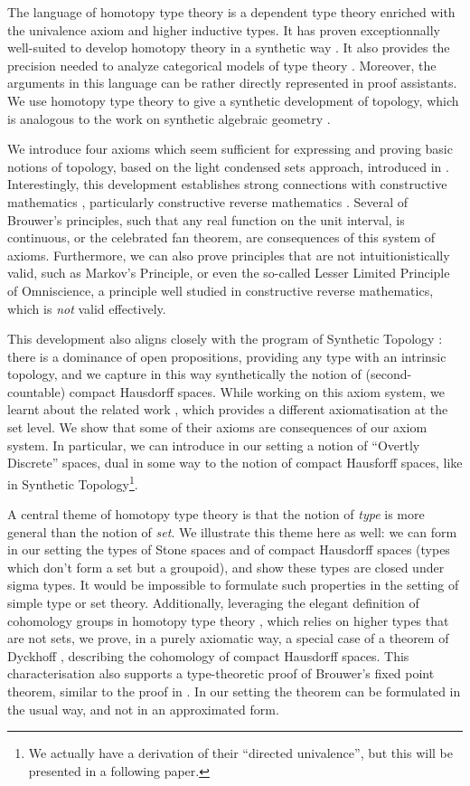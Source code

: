 The language of homotopy type theory is a  dependent type theory enriched with the univalence axiom and higher inductive types. It has proven exceptionnally well-suited to
develop homotopy theory in a synthetic way \cite{hott}. It also provides
the precision needed to analyze categorical models of type theory \cite{vanderweide2024}.
Moreover, the arguments in this language can be rather directly represented in proof assistants. We use homotopy type theory to give a synthetic development of topology, which is analogous to the work on synthetic algebraic geometry \cite{draft}. 

We introduce 
four axioms which seem sufficient for expressing and proving basic notions of topology, based on the light condensed
sets approach, introduced in \cite{Scholze}.
Interestingly, this development establishes strong connections with constructive mathematics \cite{Bishop},
particularly constructive reverse mathematics \cite{ReverseMathsBishop,HannesDiener}. Several of Brouwer's principles, such that
any real function on the unit interval, is continuous, or the celebrated fan theorem, are consequences of this system
of axioms. Furthermore, we can also prove principles that are not intuitionistically valid, such as Markov's Principle,
or even the so-called Lesser Limited Principle of Omniscience, a principle well studied in constructive reverse mathematics,
which is {\em not} valid effectively.

This development also aligns closely with the program of Synthetic
Topology \cite{SyntheticTopologyEscardo,SyntheticTopologyLesnik}:
there is a dominance of open propositions, providing any type with an intrinsic
topology, and we capture in this way synthetically the notion of (second-countable) compact Hausdorff spaces.
While working on this axiom system, we learnt about the related work \cite{bc24}, which provides a different axiomatisation
at the set level. We show that some of their axioms are consequences of our axiom system. In particular, we can introduce
in our setting a notion of ``Overtly Discrete'' spaces, dual in some way to the notion of compact Hausforff spaces, like
in Synthetic Topology\footnote{We actually have a
derivation of their ``directed univalence'', but this will be presented in a following paper.}.

A central theme of homotopy type theory is that the notion of {\em type} is more general than the notion of {\em set}. We illustrate
this theme here as well: we can form in our setting the types of Stone spaces and of compact Hausdorff spaces
(types which don't form a set but a groupoid),
and show these types are
closed under sigma types. It would be impossible to formulate such properties in the setting of simple type or set theory.
Additionally, leveraging the elegant definition of cohomology groups in homotopy type theory \cite{hott}, which relies
on higher types that are not sets, we prove, in a purely axiomatic way,
a special case of a theorem of Dyckhoff \cite{dyckhoff76}, describing
the cohomology of compact Hausdorff spaces. This characterisation also supports a type-theoretic proof of
Brouwer's fixed point theorem, similar to the proof in \cite{shulman-Brouwer-fixed-point}. In our setting the theorem can be formulated in the usual
way, and not in an approximated form.

